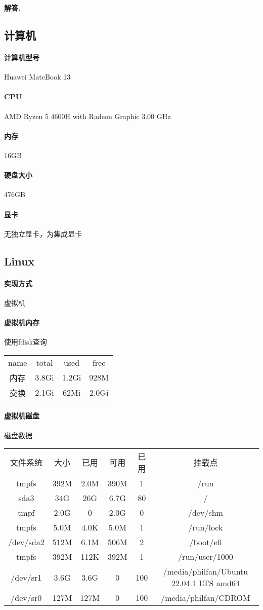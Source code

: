 \documentclass[12pt, a4paper, oneside]{ctexart}
\newenvironment{solution}{\par\noindent\textbf{解答. }}{\\\par}
\begin{document}
\begin{solution}
	\setcounter{section}{1}
	\subsection{计算机}
		\paragraph{计算机型号}Huawei MateBook 13
		\paragraph{CPU}AMD Ryzen 5 4600H with Radeon Graphic 3.00 GHz
		\paragraph{内存}16GB			
		\paragraph{硬盘大小}476GB
		\paragraph{显卡}无独立显卡，为集成显卡
	\subsection{Linux}
		\paragraph{实现方式}虚拟机
		\paragraph{虚拟机内存}
		使用fdisk查询\\
	\begin{tabular}{cccc}
		\hline
		name&total&used&free\\
		内存&3.8Gi&1.2Gi&928M\\
		交换&2.1Gi&62Mi&2.0Gi\\
		\hline
	\end{tabular}
		\paragraph{虚拟机磁盘}
		磁盘数据\\
\begin{tabular}{cccccc}
	\hline
	文件系统& 大小& 已用&  可用& 已用& 挂载点\\
	tmpfs&392M&2.0M&390M&1&/run\\
	sda3&34G&26G&6.7G&80&/\\
	tmpf&2.0G&0&2.0G&0&/dev/shm\\
	tmpfs&5.0M&4.0K&5.0M&1&/run/lock\\
	/dev/sda2&512M&6.1M&506M&2&/boot/efi\\
	tmpfs&392M&112K&392M&1&/run/user/1000\\
	/dev/sr1&3.6G& 3.6G&0&100&/media/philfan/Ubuntu 22.04.1 LTS amd64\\
	/dev/sr0&127M&127M&0&100&/media/philfan/CDROM\\
	\hline
\end{tabular}

\end{solution}
\end{document}
